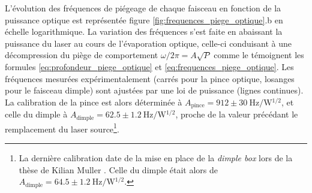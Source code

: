 L'évolution des fréquences de piégeage de chaque faisceau en fonction de la puissance optique est représentée figure \ref{fig:frequences_piege_optique}.b en échelle logarithmique. La variation des fréquences s'est faite en abaissant la puissance du laser au cours de l'évaporation optique, celle-ci conduisant à une décompression du piège de comportement $\omega /2\pi =A \sqrt{P}$ comme le témoignent les formules \ref{eq:profondeur_piege_optique} et \ref{eq:frequences_piege_optique}. Les fréquences mesurées expérimentalement (carrés pour la pince optique, losanges pour le faisceau dimple) sont ajustées par une loi de puissance (lignes continues). La calibration de la pince est alors déterminée à $A_{\mathrm{pince}}=912\pm \SI{30}{\hertz\per\watt^{1/2}}$, et celle du dimple à $A_{\mathrm{dimple}}=62.5\pm \SI{1.2}{\hertz\per\watt^{1/2}}$, proche de la valeur précédant le remplacement du laser source\footnote{La dernière calibration date de la mise en place de la \emph{dimple box} lors de la thèse de Kilian Muller \citep{muller2015coherent}. Celle du dimple était alors de $A_{\mathrm{dimple}}=64.5\pm \SI{1.2}{\hertz\per\watt^{1/2}}$.}.



















